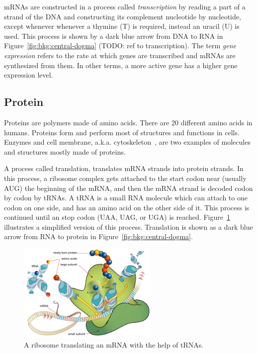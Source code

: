 mRNAs are constructed in a process called \emph{transcription} by reading a part of a strand of the DNA and constructing its complement nucleotide by nucleotide, except whenever whenever a thymine (T) is required, instead an uracil (U) is used. This process is shown by a dark blue arrow from DNA to RNA in Figure~\ref{fig:bkg:central-dogma} (TODO: ref to transcription). The term \emph{gene expression} refers to the rate at which genes are transcribed and mRNAs are synthesized from them. In other terms, a more active gene has a higher gene expression level.

\subsection{Protein}
Proteins are polymers made of amino acids. There are 20 different amino acids in humans. Proteins form and perform most of structures and functions in cells. Enzymes and cell membrane, a.k.a. cytoskeleton~\cite[Ch. 16]{the-cell}, are two examples of molecules and structures mostly made of proteins.

A process called translation, translates mRNA strands into protein strands. In this process, a ribosome complex gets attached to the start codon near (usually AUG) the beginning of the mRNA, and then the mRNA strand is decoded codon by codon by tRNAs. A tRNA is a small RNA molecule which can attach to one codon on one side, and has an amino acid on the other side of it. This process is continued until an stop codon (UAA, UAG, or UGA) is reached. Figure~\ref{fig:bkg:translation} illustrates a simplified version of this process. Translation is shown as a dark blue arrow from RNA to protein in Figure~\ref{fig:bkg:central-dogma}.

\begin{figure}[!ht]
  \centering
  \includegraphics[width=0.6\textwidth]{figs/background/640px-Ribosome_mRNA_translation_en}
  \caption{A ribosome translating an mRNA with the help of tRNAs.}
  \label{fig:bkg:translation}
\end{figure}

